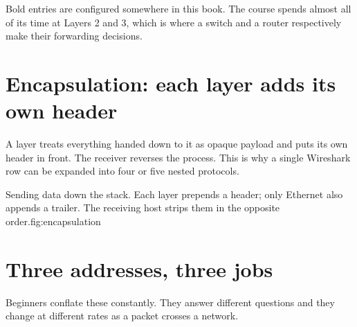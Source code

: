 \begin{keyidea}
Bold entries are configured somewhere in this book. The course spends
almost all of its time at Layers 2 and 3, which is where a switch and a
router respectively make their forwarding decisions.
\end{keyidea}

\section{Encapsulation: each layer adds its own header}
A layer treats everything handed down to it as opaque payload and puts
its own header in front. The receiver reverses the process. This is why
a single Wireshark row can be expanded into four or five nested
protocols.

\begin{utpfig}[Encapsulation]{Sending data down the stack. Each layer prepends a
header; only Ethernet also appends a trailer. The receiving host strips them in
the opposite order.}{fig:encapsulation}
\end{utpfig}

\section{Three addresses, three jobs}
Beginners conflate these constantly. They answer different questions and
they change at different rates as a packet crosses a network.

